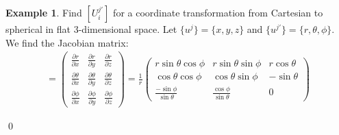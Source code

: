 \documentclass{book}
\theoremstyle{definition}
\newtheorem{exmp}{Example}[section]
\begin{document}
\begin{exmp}
	Find $[U^{j'}_i]$ for a coordinate transformation from Cartesian to spherical in flat 3-dimensional space. Let $\{u^j\} = \{ x,y,z\}$ and $\{u^{j'} \} = \{ r, \theta, \phi\} $. We find the Jacobian matrix:
	\begin{align*}
	[U^{j'}_i] = 
	\begin{pmatrix}
	\frac{\partial r}{\partial x} & \frac{\partial r}{\partial y} & \frac{\partial r}{\partial z}\\
	\frac{\partial \theta}{\partial x} & \frac{\partial \theta}{\partial y} & \frac{\partial \theta}{\partial z}\\
	\frac{\partial \phi}{\partial x} & \frac{\partial \phi}{\partial y} & \frac{\partial \phi}{\partial z}
	\end{pmatrix}
	=\frac{1}{r}
	\begin{pmatrix}
	r\sin\theta\cos\phi & r\sin\theta\sin\phi & r\cos\theta\\
	\cos\theta\cos\phi & \cos\theta\sin\phi & -\sin\theta\\
	\frac{-\sin\phi}{\sin\theta} & \frac{\cos\phi}{\sin\theta} & 0
	\end{pmatrix}
	\end{align*}
\end{exmp}\qed
\end{document}
